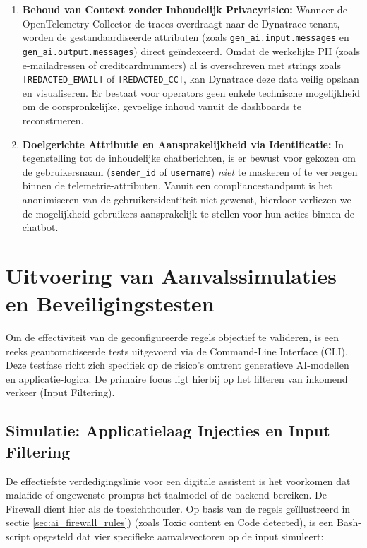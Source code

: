\begin{enumerate}
    \item \textbf{Behoud van Context zonder Inhoudelijk Privacyrisico:} Wanneer de OpenTelemetry Collector de traces overdraagt naar de Dynatrace-tenant, worden de gestandaardiseerde attributen (zoals \texttt{gen\_ai.input.messages} en \texttt{gen\_ai.\-output.messages}) direct geïndexeerd. Omdat de werkelijke PII (zoals e-mailadressen of creditcardnummers) al is overschreven met strings zoals \texttt{[REDACTED\_EMAIL]} of \texttt{[REDACTED\_CC]}, kan Dynatrace deze data veilig opslaan en visualiseren. Er bestaat voor operators geen enkele technische mogelijkheid om de oorspronkelijke, gevoelige inhoud vanuit de dashboards te reconstrueren.
    \item \textbf{Doelgerichte Attributie en Aansprakelijkheid via Identificatie:} In tegenstelling tot de inhoudelijke chatberichten, is er bewust voor gekozen om de gebruikersnaam (\texttt{sender\_id} of \texttt{username}) \textit{niet} te maskeren of te verbergen binnen de telemetrie-attributen. Vanuit een compliancestandpunt is het anonimiseren van de gebruikersidentiteit niet gewenst, hierdoor verliezen we de mogelijkheid gebruikers aansprakelijk te stellen voor hun acties binnen de chatbot. 
\end{enumerate}

\section{Uitvoering van Aanvalssimulaties en Beveiligingstesten}
\label{sec:aanvalssimulaties_en_beveiligingstesten}

Om de effectiviteit van de geconfigureerde regels objectief te valideren, is een reeks geautomatiseerde tests uitgevoerd via de Command-Line Interface (CLI). Deze testfase richt zich specifiek op de risico's omtrent generatieve AI-modellen en applicatie-logica. De primaire focus ligt hierbij op het filteren van inkomend verkeer (Input Filtering).

\subsection{Simulatie: Applicatielaag Injecties en Input Filtering}

De effectiefste verdedigingslinie voor een digitale assistent is het voorkomen dat malafide of ongewenste prompts het taalmodel of de backend bereiken. De Firewall dient hier als de toezichthouder. Op basis van de regels geïllustreerd in sectie \ref{sec:ai_firewall_rules}) (zoals Toxic content en Code detected), is een Bash-script opgesteld dat vier specifieke aanvalsvectoren op de input simuleert:

